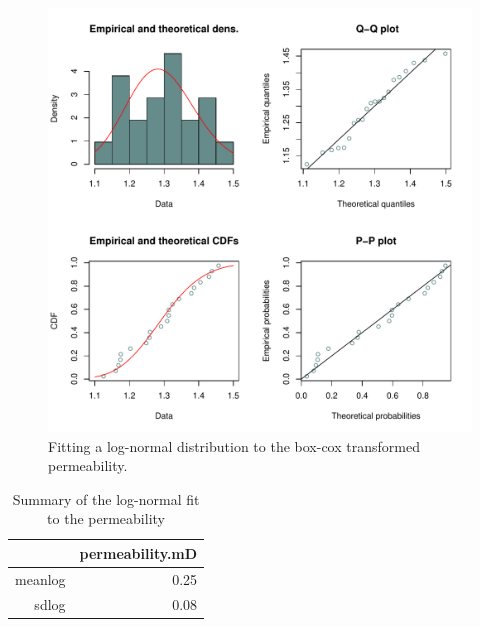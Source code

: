 \documentclass[review,authoryear, 12pt]{elsarticle}\usepackage[]{graphicx}\usepackage[]{color}
\makeatletter
\def\maxwidth{ %
  \ifdim\Gin@nat@width>\linewidth
    \linewidth
  \else
    \Gin@nat@width
  \fi
}
\newenvironment{knitrout}{}{} %
\makeatother
\begin{document}
\begin{knitrout}
\color{fgcolor}\begin{figure}[]

\includegraphics[width=\maxwidth]{figure/perm_fit} \caption[Fitting a log-normal distribution to the box-cox transformed permeability]{Fitting a log-normal distribution to the box-cox transformed permeability.\label{Fig:perm_fit}}
\end{figure}


\end{knitrout}



\begin{table}[ht]
\centering
\begin{tabular}{rr}
  \hline
 & permeability.mD \\ 
  \hline
meanlog & 0.25 \\ 
  sdlog & 0.08 \\ 
   \hline
\end{tabular}
\caption{{Summary of the log-normal fit to the permeability}} 
\label{Tab:Permfit}
\end{table}



\pagebreak
\end{document}
